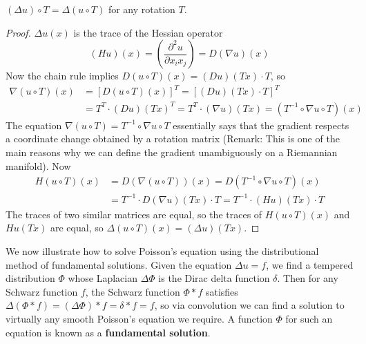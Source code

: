 \begin{theorem}
    $(\Delta u) \circ T = \Delta (u \circ T)$ for any rotation $T$.
\end{theorem}
\begin{proof}
    $\Delta u(x)$ is the trace of the Hessian operator
    \[ (Hu)(x) = \left( \frac{\partial^2 u}{\partial x_ix_j} \right) = D(\nabla u)(x) \]
    Now the chain rule implies $D(u \circ T)(x) = (Du)(Tx) \cdot T$, so
    \begin{align*}
        \nabla (u \circ T)(x) &= [D(u \circ T)(x)]^T = [(Du)(Tx) \cdot T]^T\\
        &= T^T \cdot (Du)(Tx)^T = T^T \cdot (\nabla u)(Tx) = (T^{-1} \circ \nabla u \circ T)(x)
    \end{align*}
    The equation $\nabla (u \circ T) = T^{-1} \circ \nabla u \circ T$ essentially says that the gradient respects a coordinate change obtained by a rotation matrix (Remark: This is one of the main reasons why we can define the gradient unambiguously on a Riemannian manifold). Now
    \begin{align*}
        H(u \circ T)(x) &= D(\nabla (u \circ T))(x) = D(T^{-1} \circ \nabla u \circ T)(x)\\
        &= T^{-1} \cdot D(\nabla u)(Tx) \cdot T = T^{-1} \cdot (Hu)(Tx) \cdot T
    \end{align*}
    The traces of two similar matrices are equal, so the traces of $H(u \circ T)(x)$ and $Hu(Tx)$ are equal, so $\Delta (u \circ T)(x) = (\Delta u)(Tx)$.
\end{proof}

We now illustrate how to solve Poisson's equation using the distributional method of fundamental solutions. Given the equation $\Delta u = f$, we find a tempered distribution $\Phi$ whose Laplacian $\Delta \Phi$ is the Dirac delta function $\delta$. Then for any Schwarz function $f$, the Schwarz function $\Phi * f$ satisfies $\Delta(\Phi * f) = (\Delta \Phi) * f = \delta * f = f$, so via convolution we can find a solution to virtually any smooth Poisson's equation we require. A function $\Phi$ for such an equation is known as a {\bf fundamental solution}.

